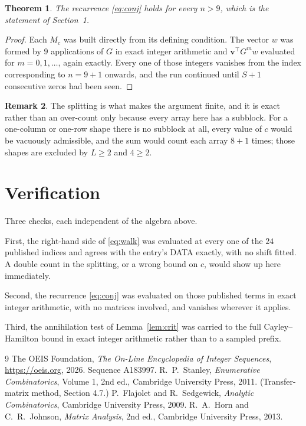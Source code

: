\documentclass[11pt,a4paper]{article}
\theoremstyle{plain}
\newtheorem{theorem}{Theorem}
\theoremstyle{definition}
\newtheorem{remark}[theorem]{Remark}
\begin{document}
\begin{theorem}
The recurrence \eqref{eq:conj} holds for every $n>9$, which is the statement of
Section~1.
\end{theorem}

\begin{proof}
Each $M_c$ was built directly from its defining condition. The vector $w$ was formed by
$9$ applications of $G$ in exact integer arithmetic and $\mathbf{v}^{\!\top}G^{m}w$
evaluated for $m=0,1,\dots$, again exactly. Every one of those integers vanishes from the
index corresponding to $n=9+1$ onwards, and the run continued until $S+1$ consecutive
zeros had been seen.
\end{proof}

\begin{remark}
The splitting is what makes the argument finite, and it is exact rather than an
over-count only because every array here has a subblock. For a one-column or one-row
shape there is no subblock at all, every value of $c$ would be vacuously admissible, and the
sum would count each array $8+1$ times; those shapes are excluded by $L\ge2$ and
$4\ge2$.
\end{remark}

\section{Verification}

Three checks, each independent of the algebra above.

First, the right-hand side of \eqref{eq:walk} was evaluated at every one of the $24$
published indices and agrees with the entry's DATA exactly, with no shift fitted. A double
count in the splitting, or a wrong bound on $c$, would show up here immediately.

Second, the recurrence \eqref{eq:conj} was evaluated on those published terms in exact
integer arithmetic, with no matrices involved, and vanishes wherever it applies.

Third, the annihilation test of Lemma~\ref{lem:crit} was carried to the full
Cayley--Hamilton bound in exact integer arithmetic rather than to a sampled prefix.

\begin{thebibliography}{9}
 The OEIS Foundation, \emph{The On-Line Encyclopedia of Integer
Sequences}, \url{https://oeis.org}, 2026. Sequence A183997.
 R.~P.~Stanley, \emph{Enumerative Combinatorics}, Volume 1, 2nd ed.,
Cambridge University Press, 2011. (Transfer-matrix method, Section 4.7.)
 P.~Flajolet and R.~Sedgewick, \emph{Analytic Combinatorics}, Cambridge
University Press, 2009.
 R.~A.~Horn and C.~R.~Johnson, \emph{Matrix Analysis}, 2nd ed., Cambridge
University Press, 2013.
\end{thebibliography}
\end{document}
